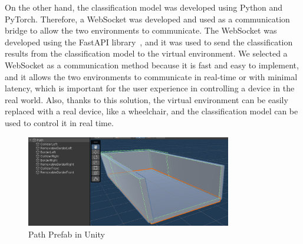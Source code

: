 On the other hand, the classification model was developed using Python and PyTorch.
Therefore, a WebSocket was developed and used as a communication bridge to allow the two environments to communicate.
The WebSocket was developed using the FastAPI library~\cite{noauthor_tiangolofastapi_nodate}, and it was used to send the classification results from the classification model to the virtual environment.
We selected a WebSocket as a communication method because it is fast and easy to implement, and it allows the two environments to communicate in real-time or with minimal latency, which is important for the user experience in controlling a device in the real world.
Also, thanks to this solution, the virtual environment can be easily replaced with a real device, like a wheelchair, and the classification model can be used to control it in real time.
\begin{figure}
    \centering
    \includegraphics[width=0.8\textwidth]{Figures/Approach/path_prefab}
    \caption{Path Prefab in Unity}
    \label{fig:path_prefab}
\end{figure}

